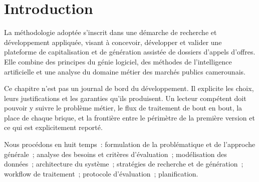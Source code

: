 \section{Introduction}
\label{sec:ch2-intro}

La méthodologie adoptée s'inscrit dans une démarche de recherche et
développement appliquée, visant à concevoir, développer et valider une
plateforme de capitalisation et de génération assistée de dossiers d'appels
d'offres. Elle combine des principes du génie logiciel, des méthodes de
l'intelligence artificielle et une analyse du domaine métier des marchés
publics camerounais.

Ce chapitre n'est pas un journal de bord du développement. Il explicite les
choix, leurs justifications et les garanties qu'ils produisent. Un lecteur
compétent doit pouvoir y suivre le problème métier, le flux de traitement
de bout en bout, la place de chaque brique, et la frontière entre le
périmètre de la première version et ce qui est explicitement reporté.

Nous procédons en huit temps~: formulation de la problématique et de
l'approche générale~; analyse des besoins et critères d'évaluation~;
modélisation des données~; architecture du système~; stratégies de
recherche et de génération~; workflow de traitement~; protocole
d'évaluation~; planification.
